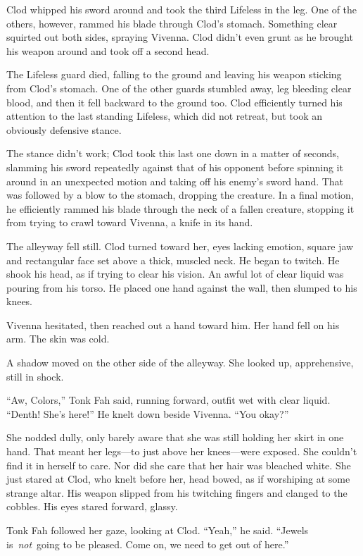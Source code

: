 Clod whipped his sword around and took the third Lifeless in the leg. One of the others, however, rammed his blade through Clod’s stomach. Something clear squirted out both sides, spraying Vivenna. Clod didn’t even grunt as he brought his weapon around and took off a second head.

The Lifeless guard died, falling to the ground and leaving his weapon sticking from Clod’s stomach. One of the other guards stumbled away, leg bleeding clear blood, and then it fell backward to the ground too. Clod efficiently turned his attention to the last standing Lifeless, which did not retreat, but took an obviously defensive stance.

The stance didn’t work; Clod took this last one down in a matter of seconds, slamming his sword repeatedly against that of his opponent before spinning it around in an unexpected motion and taking off his enemy’s sword hand. That was followed by a blow to the stomach, dropping the creature. In a final motion, he efficiently rammed his blade through the neck of a fallen creature, stopping it from trying to crawl toward Vivenna, a knife in its hand.

The alleyway fell still. Clod turned toward her, eyes lacking emotion, square jaw and rectangular face set above a thick, muscled neck. He began to twitch. He shook his head, as if trying to clear his vision. An awful lot of clear liquid was pouring from his torso. He placed one hand against the wall, then slumped to his knees.

Vivenna hesitated, then reached out a hand toward him. Her hand fell on his arm. The skin was cold.

A shadow moved on the other side of the alleyway. She looked up, apprehensive, still in shock.

“Aw, Colors,” Tonk Fah said, running forward, outfit wet with clear liquid. “Denth! She’s here!” He knelt down beside Vivenna. “You okay?”

She nodded dully, only barely aware that she was still holding her skirt in one hand. That meant her legs—to just above her knees—were exposed. She couldn’t find it in herself to care. Nor did she care that her hair was bleached white. She just stared at Clod, who knelt before her, head bowed, as if worshiping at some strange altar. His weapon slipped from his twitching fingers and clanged to the cobbles. His eyes stared forward, glassy.

Tonk Fah followed her gaze, looking at Clod. “Yeah,” he said. “Jewels is~\textit{not}~going to be pleased. Come on, we need to get out of here.”

